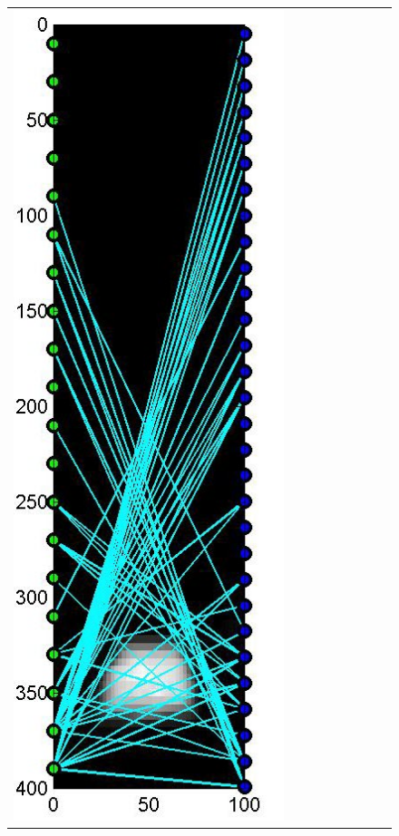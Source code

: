 \documentclass[english]{siamltex}
\begin{document}
{\begin{figure}[!h]
\begin{center}
\begin{tabular}{|c|c|c|c|c|c|c|c|c|}
			\includegraphics[width=.9\iwidth]{figures/newFigs/noisy/resultsExp-8-designs}
			&

\end{tabular}
\end{center}
\end{figure}}
\end{document}

